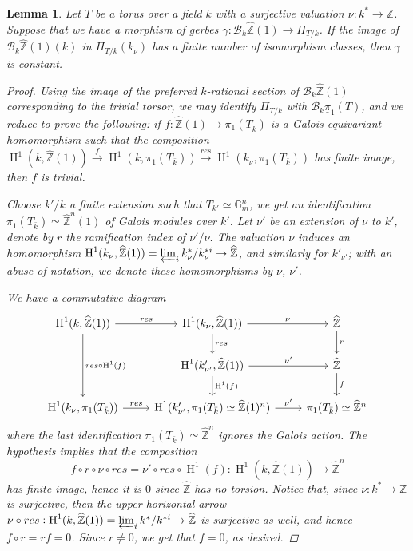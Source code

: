 \documentclass[11pt]{amsart}
\theoremstyle{plain}
\newtheorem{lemma}[theorem]{Lemma}
\theoremstyle{definition}
\newcommand{\on}{\operatorname}
\newcommand{\1}{\mathbb{1}}
\newcommand{\G}{\mathbb{G}}
\newcommand{\hz}{\hat{\mathbb{Z}}}
\newcommand{\mc}{\mathcal}
\newcommand{\upi}{\underline{\pi}}
\newcommand{\xar}{\xrightarrow}
\newcommand{\Z}{\mathbb{Z}}
\renewcommand{\H}{\on{H}}
\renewcommand{\projlim}{\varprojlim}
\renewcommand{\hat}{\widehat}
\newcommand\cB{\mathcal{B}}
\begin{document}
\begin{lemma}\label{uniqueloop}
	Let $T$ be a torus over a field $k$ with a surjective valuation $\nu:k^{*}\to\Z$. Suppose that we have a morphism of gerbes $\gamma:\cB_{k}\hz(1)\to \Pi_{T/k}$. If the image of $\cB_{k}\hz(1)(k)$ in $\Pi_{T/k}(k_{\nu})$ has a finite number of isomorphism classes, then $\gamma$ is constant.
	\begin{proof}
    Using the image of the preferred $k$-rational section of $\cB_{k}\hz(1)$ corresponding to the trivial torsor, we may identify $\Pi_{T/k}$ with $\mc{B}_{k}\upi_{1}(T)$, and we reduce to prove the following: if $f:\hz(1)\to\pi_{1}(T_{\bar{k}})$ is a Galois equivariant homomorphism such that the composition $\H^{1}(k,\hz(1))\xar{f} \H^{1}(k,\pi_{1}(T_{\bar{k}})) \xar{res} \H^{1}(k_{\nu},\pi_{1}(T_{\bar{k}}))$ has finite image, then $f$ is trivial. 

    Choose $k'/k$ a finite extension such that $T_{k'}\simeq\G_{m}^{n}$, we get an identification $\pi_{1}(T_{\bar{k}})\simeq \hz^{n}(1)$ of Galois modules over $k'$. Let $\nu'$ be an extension of $\nu$ to $k'$, denote by $r$ the ramification index of $\nu'/\nu$. The valuation $\nu$ induces an homomorphism $\H^{1}(k_{\nu},\hz(1))=\projlim_{i}k_{\nu}^{*}/k_{\nu}^{*i}\to \hz$, and similarly for $k'_{\nu'}$; with an abuse of notation, we denote these homomorphisms by $\nu$, $\nu'$. 
    

    We have a commutative diagram
    \[\begin{tikzcd}
        \H^{1}(k,\hz(1))\rar["res"] \ar[dd,"res\circ \H^{1}(f)"]     &   \H^{1}(k_{\nu},\hz(1))\dar["res"]\rar["\nu"]    &   \hz\dar["r"]    \\
                                                &   \H^{1}(k'_{\nu'},\hz(1))\dar["\H^{1}(f)"]\rar["\nu'"]            &   \hz\dar["f"]         \\
        \H^{1}(k_{\nu},\pi_{1}(T_{\bar{k}}))\rar["res"] & \H^{1}(k'_{\nu'},\pi_{1}(T_{\bar{k}})\simeq\hz(1)^{n})\rar["\nu'"] & \pi_{1}(T_{\bar{k}})\simeq \hz^{n}
    \end{tikzcd}\]
    where the last identification $\pi_{1}(T_{\bar{k}})\simeq \hz^{n}$ ignores the Galois action. The hypothesis implies that the composition 
    \[f\circ r \circ \nu \circ res = \nu' \circ res \circ \H^{1}(f) : \H^{1}(k,\hz(1)) \to \hz^{n}\]
    has finite image, hence it is $0$ since $\hz$ has no torsion.  Notice that, since $\nu:k^{*}\to\Z$ is surjective, then the upper horizontal arrow $\nu \circ res: \H^{1}(k,\hz(1))=\projlim_{i}k^{*}/k^{*i} \to \hz$ is surjective as well, and hence $f\circ r =rf=0$. Since $r\neq 0$, we get that $f=0$, as desired.
    

\end{proof}
\end{lemma}
\end{document}
